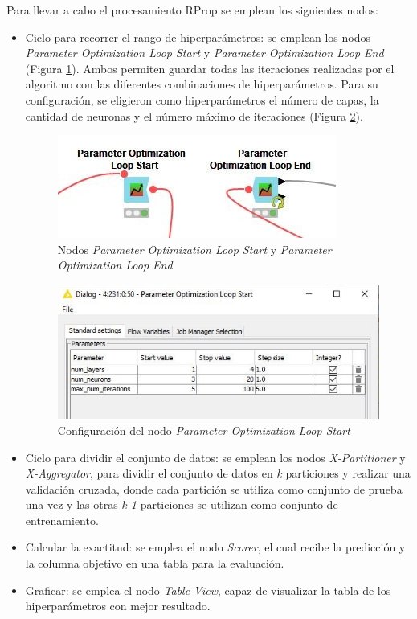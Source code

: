 Para llevar a cabo el procesamiento RProp se emplean los siguientes nodos: 
\begin{itemize}
	\item Ciclo para recorrer el rango de hiperparámetros: se emplean los nodos \textit{Parameter Optimization Loop Start} y \textit{Parameter Optimization Loop End} (Figura \ref{fig:nodos-param-opt-loop}). Ambos permiten guardar todas las iteraciones realizadas por el algoritmo con las diferentes combinaciones de hiperparámetros. Para su configuración, se eligieron como hiperparámetros el número de capas, la cantidad de neuronas y el número máximo de iteraciones (Figura \ref{fig:conf-nodo-param-loop}).
	\begin{figure}[H]
		\centering
		\includegraphics[width=0.5\linewidth]{"figuras/capi 2/nodos-param-opt-loop"}
		\caption[Nodos Parameter Optimization Loop Start y Parameter Optimization Loop End]{Nodos \textit{Parameter Optimization Loop Start} y \textit{Parameter Optimization Loop End}}
		\label{fig:nodos-param-opt-loop}
	\end{figure}
	
	\begin{figure}[H]
		\centering
		\includegraphics[width=0.6\linewidth]{"figuras/capi 2/conf-nodo-param-loop"}
		\caption[Configuración del nodo Parameter Optimization Loop Start]{Configuración del nodo \textit{Parameter Optimization Loop Start}}
		\label{fig:conf-nodo-param-loop}
	\end{figure}
	
	\item Ciclo para dividir el conjunto de datos: se emplean los nodos \textit{X-Partitioner} y \textit{X-Aggregator}, para dividir el conjunto de datos en \textit{k} particiones y realizar una validación cruzada, donde cada partición se utiliza como conjunto de prueba una vez y las otras \textit{k-1} particiones se utilizan como conjunto de entrenamiento.
	\item Calcular la exactitud: se emplea el nodo \textit{Scorer}, el cual recibe la predicción y la columna objetivo en una tabla para la evaluación. 
	\item Graficar: se emplea el nodo \textit{Table View}, capaz de visualizar la tabla de los hiperparámetros con mejor resultado.	
\end{itemize}


